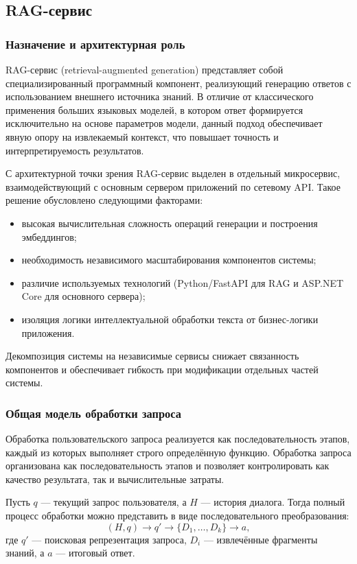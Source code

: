 \documentclass{article}
\begin{document}
\subsection{RAG-сервис}

\subsubsection{Назначение и архитектурная роль}

RAG-сервис (retrieval-augmented generation) представляет собой специализированный программный компонент, реализующий генерацию ответов с использованием внешнего источника знаний. В отличие от классического применения больших языковых моделей, в котором ответ формируется исключительно на основе параметров модели, данный подход обеспечивает явную опору на извлекаемый контекст, что повышает точность и интерпретируемость результатов.

С архитектурной точки зрения RAG-сервис выделен в отдельный микросервис, взаимодействующий с основным сервером приложений по сетевому API. Такое решение обусловлено следующими факторами:
\begin{itemize}
\item высокая вычислительная сложность операций генерации и построения эмбеддингов;
\item необходимость независимого масштабирования компонентов системы;
\item различие используемых технологий (Python/FastAPI для RAG и ASP.NET Core для основного сервера);
\item изоляция логики интеллектуальной обработки текста от бизнес-логики приложения.
\end{itemize}

Декомпозиция системы на независимые сервисы снижает связанность компонентов и обеспечивает гибкость при модификации отдельных частей системы.

\subsubsection{Общая модель обработки запроса}

Обработка пользовательского запроса реализуется как последовательность этапов, каждый из которых выполняет строго определённую функцию. Обработка запроса организована как последовательность этапов и позволяет контролировать как качество результата, так и вычислительные затраты.

Пусть $q$ — текущий запрос пользователя, а $H$ — история диалога. Тогда полный процесс обработки можно представить в виде последовательного преобразования:
\[
(H, q) \rightarrow q' \rightarrow \{D_1, \dots, D_k\} \rightarrow a,
\]
где $q'$ — поисковая репрезентация запроса, $D_i$ — извлечённые фрагменты знаний, а $a$ — итоговый ответ.
\end{document}
